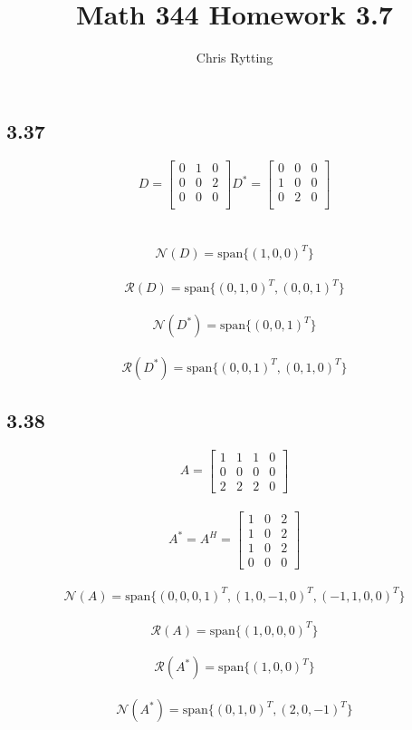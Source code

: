 \documentclass[letterpaper,12pt]{article}
\title{Math 344 Homework 3.7}
\author{Chris Rytting}
\theoremstyle{definition}
\begin{document}
\maketitle
\subsection*{3.37}


\[D = \begin{bmatrix} 
0&1&0\\
0&0&2\\
0&0&0\\
\end{bmatrix}
D^*  = \begin{bmatrix} 
0&0&0\\
1&0&0\\
0&2&0\\
\end{bmatrix}\]\\
\smallskip\\
\[\mathscr{N}(D) = \text{span}\{(1,0,0)^T\}\]\\
\[\mathscr{R}(D) = \text{span}\{(0,1,0)^T,(0,0,1)^T\} \]\\
\[\mathscr{N}(D^*) = \text{span}\{(0,0,1)^T\}\]\\
\[\mathscr{R}(D^*) =  \text{span}\{(0,0,1)^T,(0,1,0)^T\}\]

\subsection*{3.38}
\[A=\begin{bmatrix}
1 &1&1& 0 \\
0&0&0& 0\\
2&2&2& 0
\end{bmatrix}\]\\
\[A^* = A^H =\begin{bmatrix}
1 &0&2\\
1&0&2\\
1&0&2\\
0&0&0
\end{bmatrix}\]\\
\[\mathscr{N}(A) = \text{span}\{(0,0,0,1)^T, (1,0,-1,0)^T, (-1,1,0,0)^T\}\]\\
\[\mathscr{R}(A) = \text{span}\{(1,0,0,0)^T\}\]\\
\[\mathscr{R}(A^*) = \text{span}\{(1,0,0)^T\}\]\\
\[\mathscr{N}(A^*) = \text{span}\{(0,1,0)^T, (2,0,-1)^T\} \]\\
\end{document}
